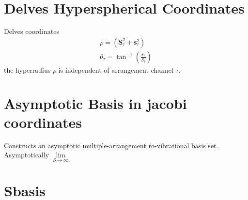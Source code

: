 \documentclass[aps,pra,onecolumn,showpacs,floatfix]{revtex4}
\begin{document}
\section{Delves Hyperspherical Coordinates}
Delves coordinates\cite{Delves:1958,Delves:1960}
\begin{align}\label{eqn:delves}
	\rho = (\mathbf{S}^2_\tau + \mathbf{s}^2_\tau ) \\
	\theta_\tau = \tan^{-1}({\frac{s_\tau}{S_\tau}})
\end{align}
the hyperradius $\rho$ is independent of arrangement channel $\tau$.

\section{Asymptotic Basis in jacobi coordinates}
Constructs an asymptotic multiple-arrangement ro-vibrational basis set.
Asymptotically $\lim\limits_{S\to\infty}$

\section{Sbasis}
\begin{acknowledgments}
\end{acknowledgments}


\end{document}

